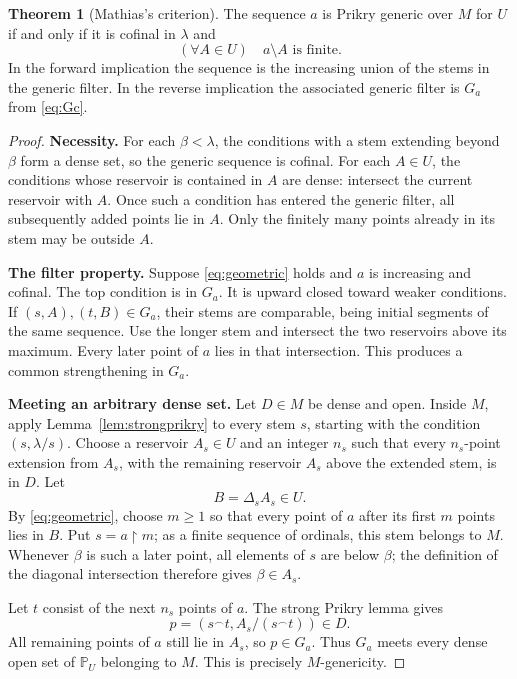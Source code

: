 \documentclass[11pt,letterpaper]{article}
\theoremstyle{definition}
\newtheorem{theorem}[definition]{Theorem}
\numberwithin{equation}{section}
\newcommand{\restr}{\mathbin{\upharpoonright}}
\begin{document}
\begin{theorem}[Mathias's criterion]\label{thm:mathias}
The sequence $a$ is Prikry generic over $M$ for $U$ if and only if it is cofinal in $\lambda$ and
\begin{equation}\label{eq:geometric}
 (\forall A\in U)\quad a\setminus A\text{ is finite}.
\end{equation}
In the forward implication the sequence is the increasing union of the stems in the generic filter. In the reverse implication the associated generic filter is $G_a$ from \eqref{eq:Gc}.
\end{theorem}

\begin{proof}
\textbf{Necessity.}
For each $\beta<\lambda$, the conditions with a stem extending beyond $\beta$ form a dense set, so the generic sequence is cofinal. For each $A\in U$, the conditions whose reservoir is contained in $A$ are dense: intersect the current reservoir with $A$. Once such a condition has entered the generic filter, all subsequently added points lie in $A$. Only the finitely many points already in its stem may be outside $A$.

\textbf{The filter property.}
Suppose \eqref{eq:geometric} holds and $a$ is increasing and cofinal. The top condition is in $G_a$. It is upward closed toward weaker conditions. If $(s,A),(t,B)\in G_a$, their stems are comparable, being initial segments of the same sequence. Use the longer stem and intersect the two reservoirs above its maximum. Every later point of $a$ lies in that intersection. This produces a common strengthening in $G_a$.

\textbf{Meeting an arbitrary dense set.}
Let $D\in M$ be dense and open. Inside $M$, apply Lemma~\ref{lem:strongprikry} to every stem $s$, starting with the condition $(s,\lambda/s)$. Choose a reservoir $A_s\in U$ and an integer $n_s$ such that every $n_s$-point extension from $A_s$, with the remaining reservoir $A_s$ above the extended stem, is in $D$. Let
\[
 B=\Delta_s A_s\in U.
\]
By \eqref{eq:geometric}, choose $m\ge1$ so that every point of $a$ after its first $m$ points lies in $B$. Put $s=a\restr m$; as a finite sequence of ordinals, this stem belongs to $M$. Whenever $\beta$ is such a later point, all elements of $s$ are below $\beta$; the definition of the diagonal intersection therefore gives $\beta\in A_s$.

Let $t$ consist of the next $n_s$ points of $a$. The strong Prikry lemma gives
\[
 p=(s^\frown t,A_s/(s^\frown t))\in D.
\]
All remaining points of $a$ still lie in $A_s$, so $p\in G_a$. Thus $G_a$ meets every dense open set of $\mathbb P_U$ belonging to $M$. This is precisely $M$-genericity.
\end{proof}
\end{document}
